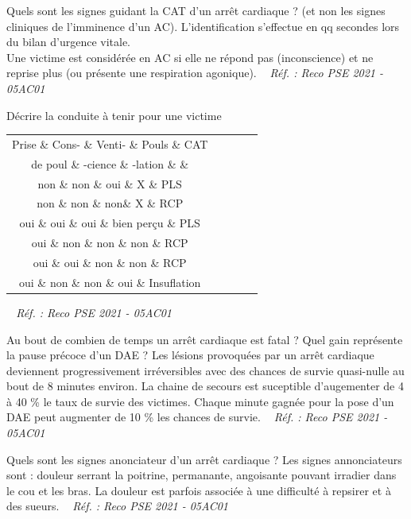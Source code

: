\documentclass[grid,avery5371,landscape]{flashcards}
\makeatletter
\newcounter{nocarte}
\newcommand{\categ}[1]{%
  \def\@categ{#1}%
  \setcounter{nocarte}{0}%
}
\newcommand{\source}[1]{%
  \medskip
  \itshape%
   ~ \hfill Réf. : #1}
\makeatother
\begin{document}
\color[HTML]{003273}
\categ{PSE}
\begin{flashcard}[bilan]{
 Quels sont les signes guidant la CAT d'un arrêt cardiaque ? (et non les signes cliniques de l'imminence d'un AC).   }
  L'identification s'effectue en qq secondes lors du bilan d'urgence vitale. \\ Une victime est considérée en AC si elle ne répond pas (inconscience) et ne reprise plus (ou présente une respiration agonique).
  \source{Reco PSE 2021 - 05AC01}
\end{flashcard}


\color[HTML]{003273}
\categ{PSE}
\begin{flashcard}[bilan]{
 Décrire la conduite à tenir pour une victime    }
  \begin{tabular}{ccccc}
         Prise   \& Cons- \& Venti- \& Pouls \& CAT \\ 
         de poul \&     -cience       \& -lation       \&       \& \\ \hline
         non \& non \& oui \& X \& PLS \\
         non \& non \& non\& X \& RCP\\
         oui \& oui \& oui \& bien perçu \& PLS \\
         oui \& non \& non \& non \& RCP \\
         oui \& oui \& non \& non \& RCP \\
         oui \& non \& non \& oui \& Insuflation
\end{tabular}
  \source{Reco PSE 2021 - 05AC01}
\end{flashcard}


\color[HTML]{003273}
\categ{PSE}
\begin{flashcard}[bilan]{
 Au bout de combien de temps un arrêt cardiaque est fatal ? Quel gain représente la pause précoce d'un DAE ?   }
  Les lésions provoquées par un arrêt cardiaque deviennent progressivement irréversibles avec des chances de survie quasi-nulle au bout de 8 minutes environ. La chaine de secours est suceptible d'augementer de 4 à 40 \% le taux de survie des victimes. Chaque minute gagnée pour la pose d'un DAE peut augmenter de 10 \% les chances de survie.
  \source{Reco PSE 2021 - 05AC01}
\end{flashcard}


\color[HTML]{003273}
\categ{PSE}
\begin{flashcard}[bilan]{
 Quels sont les signes anonciateur d'un arrêt cardiaque ?   }
  Les signes annonciateurs sont : douleur serrant la poitrine, permanante, angoisante pouvant irradier dans le cou et les bras. La douleur est parfois associée à une difficulté à repsirer et à des sueurs.
  \source{Reco PSE 2021 - 05AC01}
\end{flashcard}
\end{document}
